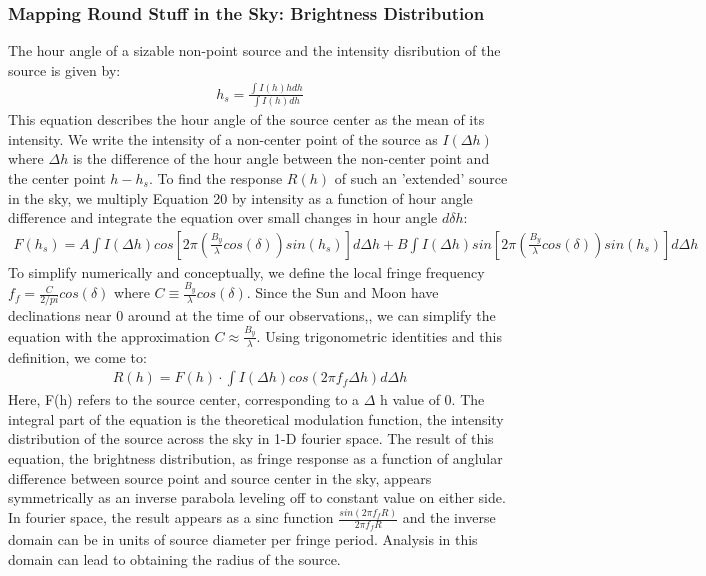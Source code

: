 \documentclass{article}
\begin{document}
\subsubsection{Mapping Round Stuff in the Sky: Brightness Distribution}
The hour angle of a sizable non-point source and the intensity
disribution of the source is given by:
\begin{align}h_{s} = \frac{\int I(h) h dh}{\int I(h) dh}
\end{align}
This equation describes the hour angle of the source center as the mean
of its intensity. We write the intensity of a non-center point of the
source as  $I(\Delta h)$ where $\Delta h$ is the difference of the hour
angle between the non-center point and the center point $h-h_{s}$. To
find the response $R(h)$ of such an 'extended' source in the sky, we
multiply Equation 20 by intensity as a function of hour angle difference
and integrate the equation over small changes in hour angle $d\delta h$:
\begin{align}F(h_{s}) =
  A\int{I(\Delta
    h)cos[2\pi(\frac{B_{y}}{\lambda}cos(\delta))sin(h_{s})] d\Delta h} +
  B\int{I(\Delta h)sin[2\pi(\frac{B_{y}}{\lambda}cos(\delta))sin(h_{s})]
  d\Delta h} 
\end{align}
To simplify numerically and conceptually, we define the local fringe
frequency $f_{f} = \frac{C}{2/pi}cos(\delta)$ where $C \equiv
\frac{B_{y}}{\lambda}cos(\delta)$. Since the Sun and Moon
have declinations near 0 around at the time of our observations,, we can
simplify the equation with the approximation $C \approx
\frac{B_{y}}{\lambda}$. Using trigonometric identities and this
definition, we come to: 
\begin{align}R(h) = F(h) \cdot \int{I(\Delta h)cos(2\pi f_{f}\Delta h)
    d\Delta h}
\end{align}
Here, F(h) refers to the source center, corresponding to a $\Delta$ h
value of 0. The integral part of the equation is the theoretical
modulation function, the intensity distribution of the source across the
sky in 1-D fourier space. The result of this equation, the brightness
distribution, as fringe response as a function of anglular difference
between source point and source center in the sky, appears symmetrically
as an inverse parabola leveling off to constant value on either side. In
fourier space, the result appears as a sinc function
$\frac{sin(2\pi{f_{f}}R)}{2\pi{f_{f}}R}$ and the inverse domain can be
in units of source diameter per fringe period. Analysis in this domain
can lead to obtaining the radius of the source.
\end{document}
